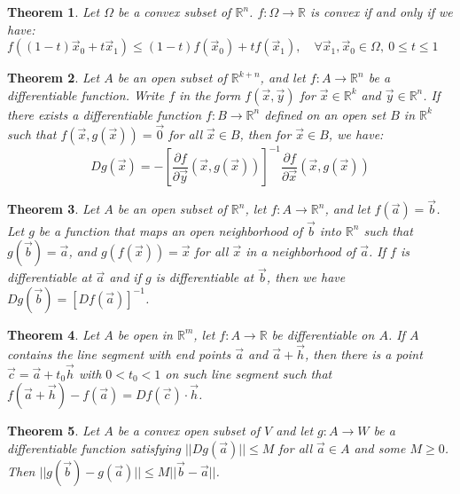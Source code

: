 \documentclass[11pt]{article}
\theoremstyle{break}
\theoremstyle{break}
\newtheorem{thm}{Theorem}[section]
\newcommand{\R}{\mathbb{R}}
\begin{document}
\begin{thm}
Let $\Omega$ be a convex subset of $\R^n$. $f : \Omega \to \R$ is convex if and only if we have: \\$f((1-t)\vec{x}_0 + t\vec{x}_1) \leq (1-t)f(\vec{x}_0) + tf(\vec{x}_1),\quad \forall \vec{x}_1,\vec{x}_0 \in \Omega,\ 0\leq t \leq 1$
\end{thm}

\begin{thm}
Let $A$ be an open subset of $\R^{k+n}$, and let $f:A \to \R^n$ be a differentiable function. Write $f$ in the form $f(\vec{x},\vec{y})$ for $\vec{x}\in \R^k$ and $\vec{y}\in \R^n$. If there exists a differentiable function $f:B \to \R^n$ defined on an open set $B $ in $\R^k$ such that $f(\vec{x},g(\vec{x})) = \vec{0}$ for all $\vec{x}\in B$, then for $\vec{x}\in B$, we have: $$Dg(\vec{x}) = -\left[\frac{\partial f}{\partial \vec{y}}(\vec{x},g(\vec{x})) \right]^{-1} \frac{\partial f}{\partial \vec{x}}(\vec{x},g(\vec{x}))$$
\end{thm}

\begin{thm}
Let $A $ be an open subset of $\R^n$, let $f:A \to \R^n$, and let $f(\vec{a}) = \vec{b}$. Let $g$ be a function that maps an open neighborhood of $\vec{b}$ into $\R^n$ such that $g(\vec{b}) = \vec{a}$, and $g(f(\vec{x})) = \vec{x}$ for all $\vec{x}$ in a neighborhood of $\vec{a}$. If $f$ is differentiable at $\vec{a}$ and if $g$ is differentiable at $\vec{b}$, then we have $Dg(\vec{b}) = [Df(\vec{a})]^{-1}$. 
\end{thm}

\begin{thm}
Let $A$ be open in $\R^m$, let $f:A \to \R$ be differentiable on $A$. If $A$ contains the line segment with end points $\vec{a}$ and $\vec{a}+ \vec{h}$, then there is a point $\vec{c} = \vec{a}+ t_0 \vec{h}$ with $0 < t_0 < 1$ on such line segment such that $f(\vec{a}+\vec{h}) - f(\vec{a}) = Df(\vec{c}) \cdot \vec{h}$. 
\end{thm}

\begin{thm}
Let $A$ be a convex open subset of $V$ and let $g: A \to W$ be a differentiable function satisfying $||Dg(\vec{a})|| \leq M$ for all $\vec{a}\in A$ and some $M \geq 0$. Then $||g(\vec{b}) - g(\vec{a})|| \leq M ||\vec{b}-\vec{a}||$. 
\end{thm}
\newpage
\end{document}
